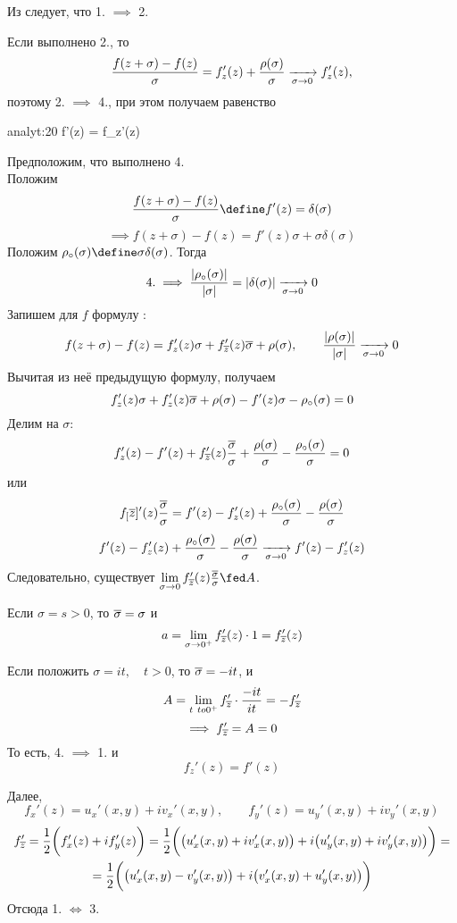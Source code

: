 \begin{iproof}
	\item Из  следует, что 1. $ \implies $ 2.
	\item Если выполнено 2., то
	$$ \frac{f(z + \sigma) - f(z)}\sigma = f_z'(z) + \frac{\rho(\sigma)}\sigma \xrightarrow[\sigma \to 0]{} f_z'(z), $$
	поэтому 2. $ \implies $ 4., при этом получаем равенство
	\begin{equ}{analyt:20}
		f'(z) = f_z'(z)
	\end{equ}
	\item Предположим, что выполнено 4. \\
	Положим
	$$ \frac{f(z + \sigma) - f(z)}\sigma \define f'(z) = \delta(\sigma) $$
	$$ \implies f(z + \sigma) - f(z) = f'(z) \sigma + \sigma \delta(\sigma) $$
	Положим $ \rho_\circ(\sigma) \define \sigma\delta(\sigma) $. Тогда
	$$ 4. \implies \frac{|\rho_\circ(\sigma)|}{|\sigma|} = |\delta(\sigma)| \xrightarrow[\sigma \to 0]{} 0 $$
	Запишем для $ f $ формулу :
	$$ f(z + \sigma) - f(z) = f_z'(z)\sigma + f_{\overline z}'(z) \overline \sigma + \rho(\sigma), \qquad \frac{|\rho(\sigma)|}{|\sigma|} \xrightarrow[\sigma \to 0]{} 0 $$
	Вычитая из неё предыдущую формулу, получаем
	$$ f_z'(z) \sigma + f_z' (z) \overline \sigma + \rho(\sigma) - f'(z)\sigma - \rho_\circ(\sigma) = 0 $$
	Делим на $ \sigma $:
	$$ f_z'(z) - f'(z) + f_{\overline z}'(z) \frac{\overline \sigma}\sigma + \frac{\rho(\sigma)}\sigma - \frac{\rho_\circ(\sigma)}\sigma = 0 $$
	или
	$$ f_[\overline z]'(z) \frac{\overline \sigma}\sigma = f'(z) - f_z'(z) + \frac{\rho_\circ(\sigma)}\sigma - \frac{\rho(\sigma)}\sigma $$
	$$ f'(z) - f_z'(z) + \frac{\rho_\circ(\sigma)}\sigma - \frac{\rho(\sigma)}\sigma \xrightarrow[\sigma \to 0]{} f'(z) - f_z'(z) $$
	Следовательно, существует $ \limz\sigma f_{\ol z}'(z) \frac{\ol \sigma}\sigma \fed A $.

	Если $ \sigma = s > 0 $, то $ \overline \sigma = \sigma $ и
	$$ a = \lim\limits_{\sigma \to 0^+} f_{\overline z}'(z) \cdot 1 = f_{\overline z}'(z) $$

	Если положить $ \sigma = it, \quad t > 0 $, то $ \overline \sigma = -it $, и
	$$ A = \lim\limits_{t\ to 0^+} f_{\overline z}' \cdot \frac{-it}{it} = -f_{\overline z}' $$
	$$ \implies f_{\overline z}' = A = 0 $$
	То есть, 4. $ \implies $ 1. и
	$$ f_z'(z) = f'(z) $$

	\item Далее,
	$$ f_x'(z) = u_x'(x, y) + iv_x'(x, y), \qquad f_y'(z) = u_y'(x, y) + iv_y'(x, y) $$
	\begin{multline*}
		f_{\overline z}' = \frac12 \bigg( f_x'(z) + if_y'(z) \bigg) = \frac12 \bigg( \big( u_x'(x, y) + iv_x'(x, y) \big) + i \big( u_y'(x, y) + iv_y'(x, y) \big) \bigg) = \\
		= \frac12 \bigg( \big( u_x'(x, y) - v_y'(x, y) \big) + i \big( v_x'(x, y) + u_y'(x, y) \big) \bigg)
	\end{multline*}
	Отсюда 1. $ \iff $ 3.
\end{iproof}

